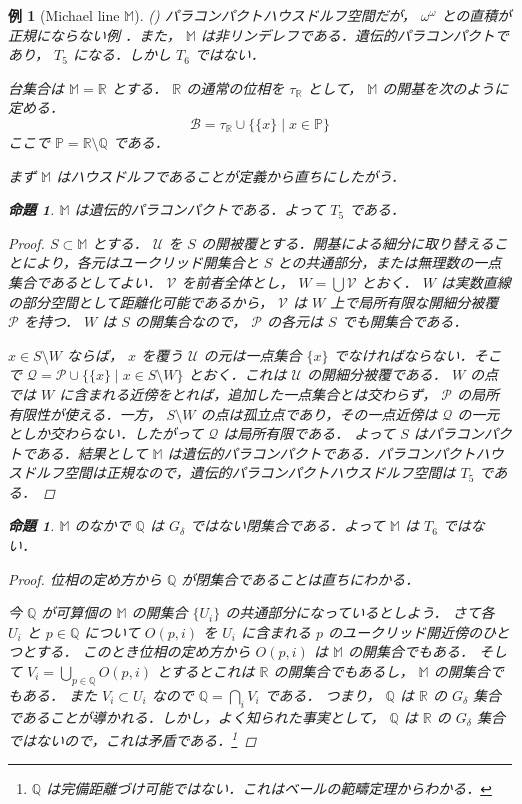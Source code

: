 \documentclass[leqno, 12pt]{ltjsarticle}
\newtheorem{prop}[thm]{命題}
\newtheorem{exam}[thm]{例}
\renewcommand{\qq}{\mathbb{Q}}
\newcommand{\rr}{\mathbb{R}}
\newcommand{\MichaelLine}{\mathbb{M}}
\newcommand{\Irrationals}{\mathbb{P}}
\newcommand{\BaireSpace}{\omega^{\omega}}
\begin{document}
\begin{exam}[Michael line $\MichaelLine$](\cite{Michael})
パラコンパクトハウスドルフ空間だが，
$\BaireSpace$
との直積が正規にならない例 ．また，
$\MichaelLine$
は非リンデレフである．遺伝的パラコンパクトであり，
$T_{5}$
になる．しかし
$T_{6}$
ではない．

台集合は
$\MichaelLine=\rr$
とする．
$\rr$
の通常の位相を
$\tau_{\rr}$
として，
$\MichaelLine$
の開基を次のように定める．
\[
\mathcal{B}=\tau_{\rr}\cup\{\{x\} \mid x\in \Irrationals\}
\]
ここで
$\Irrationals=\rr\setminus \qq$
である．

まず
$\MichaelLine$
はハウスドルフであることが定義から直ちにしたがう．

\begin{prop}
$\MichaelLine$
は遺伝的パラコンパクトである．よって
$T_{5}$
である．
\end{prop}
\begin{proof}
$S\subset \MichaelLine$
とする．
$\mathcal{U}$
を
$S$
の開被覆とする．開基による細分に取り替えることにより，各元はユークリッド開集合と
$S$
との共通部分，または無理数の一点集合であるとしてよい．
$\mathcal{V}$
を前者全体とし，
$W=\bigcup\mathcal{V}$
とおく．
$W$
は実数直線の部分空間として距離化可能であるから，
$\mathcal{V}$
は
$W$
上で局所有限な開細分被覆
$\mathcal{P}$
を持つ．
$W$
は
$S$
の開集合なので，
$\mathcal{P}$
の各元は
$S$
でも開集合である．

$x\in S\setminus W$
ならば，
$x$
を覆う
$\mathcal{U}$
の元は一点集合
$\{x\}$
でなければならない．そこで
$\mathcal{Q}=\mathcal{P}\cup\{\{x\} \mid x\in S\setminus W\}$
とおく．これは
$\mathcal{U}$
の開細分被覆である．
$W$
の点では
$W$
に含まれる近傍をとれば，追加した一点集合とは交わらず，
$\mathcal{P}$
の局所有限性が使える．一方，
$S\setminus W$
の点は孤立点であり，その一点近傍は
$\mathcal{Q}$
の一元としか交わらない．したがって
$\mathcal{Q}$
は局所有限である．
よって
$S$
はパラコンパクトである．結果として
$\MichaelLine$
は遺伝的パラコンパクトである．パラコンパクトハウスドルフ空間は正規なので，遺伝的パラコンパクトハウスドルフ空間は
$T_{5}$
である．
\end{proof}

\begin{prop}
$\MichaelLine$
のなかで
$\qq$
は
$G_{\delta}$
ではない閉集合である．よって
$\MichaelLine$
は
$T_{6}$
ではない．
\end{prop}
\begin{proof}
位相の定め方から
$\qq$
が閉集合であることは直ちにわかる．

今
$\qq$
が可算個の
$\MichaelLine$
の開集合
$\{U_{i}\}$
の共通部分になっているとしよう．
さて各
$U_{i}$
と
$p\in \qq$
について
$O(p, i)$
を
$U_{i}$
に含まれる
$p$
のユークリッド開近傍のひとつとする．
このとき位相の定め方から
$O(p,i)$
は
$\MichaelLine$
の開集合でもある．
そして
$V_{i}=\bigcup_{p\in \qq}O(p,i)$
とするとこれは
$\rr$
の開集合でもあるし，
$\MichaelLine$
の開集合でもある．
また
$V_{i}\subset U_{i}$
なので
$\qq=\bigcap_{i}V_{i}$
である．
つまり，
$\qq$
は
$\rr$
の
$G_{\delta}$
集合であることが導かれる．しかし，よく知られた事実として，
$\qq$
は
$\rr$
の
$G_{\delta}$
集合ではないので，これは矛盾である．\footnote{
$\qq$
は完備距離づけ可能ではない．これはベールの範疇定理からわかる．}
\end{proof}


\end{exam}
\end{document}
